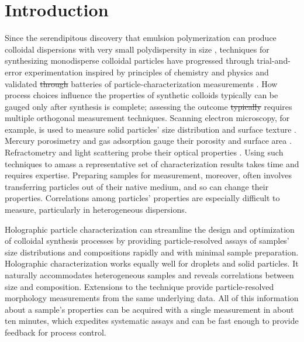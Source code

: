 \documentclass[journal=langd5,manuscript=article]{achemso}
\providecommand{\DIFadd}[1]{{\protect\color{blue}\uwave{#1}}} %
\providecommand{\DIFdel}[1]{{\protect\color{red}\sout{#1}}}                      %
\providecommand{\DIFaddbegin}{} %
\providecommand{\DIFaddend}{} %
\providecommand{\DIFdelbegin}{} %
\providecommand{\DIFdelend}{} %
\begin{document}
\section{Introduction}
\label{sec:introduction}

Since the serendipitous discovery that emulsion polymerization
can produce colloidal dispersions with very small polydispersity
in size
\cite{backus1949small,gerould1950comments},
techniques for synthesizing
monodisperse colloidal particles have progressed
through trial-and-error experimentation
inspired by principles of chemistry and physics 
and validated \DIFdelbegin \DIFdel{through }\DIFdelend \DIFaddbegin \DIFadd{by }\DIFaddend batteries of particle-characterization
measurements 
\cite{vanderhoff1956some,stober1968controlled,kotera1970colloid,dezelic1970preparation,goodwin1974studies,antl1986preparation}.
How process choices influence the properties of synthetic colloids
typically can be gauged only after
synthesis is complete;
assessing the outcome \DIFdelbegin \DIFdel{typically }\DIFdelend \DIFaddbegin \DIFadd{often }\DIFaddend requires
multiple orthogonal measurement techniques.
Scanning electron microscopy, for example, is used to measure
solid particles' size distribution and surface texture \cite{yamada85}.
Mercury porosimetry and gas adsorption gauge their porosity
\cite{giesche2006mercury} and surface area \cite{rouquerol1994}. 
Refractometry and light scattering probe their optical properties
\cite{chou54}.
Using such techniques to amass a representative 
set of characterization results
takes time and requires expertise.
Preparing samples for measurement, moreover, often involves
transferring particles out of their native medium,
and so can change their properties.
Correlations among particles' properties are especially
difficult to measure, particularly in heterogeneous
dispersions.

Holographic particle characterization can streamline
the design and optimization of colloidal synthesis processes
by providing particle-resolved assays of samples' size distributions
and compositions rapidly and with minimal sample preparation.
Holographic characterization works equally
well for droplets and solid particles. It naturally accommodates heterogeneous
samples and reveals correlations between size and composition. Extensions to the technique
provide particle-resolved morphology measurements from the same underlying data.
All of this information about a sample's properties can be acquired with a
single measurement in about ten minutes, which
expedites systematic assays and can be fast enough to provide feedback
for process control.
\end{document}
